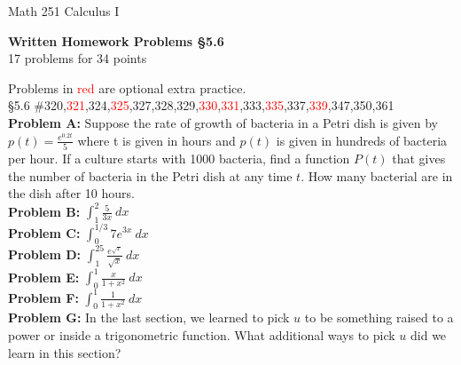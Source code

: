 \documentclass[11pt]{report}
\theoremstyle{plain}
\newcommand{\opt}[1]{\textcolor{red}{#1}}
\begin{document}
\hfill Math 251 Calculus I
\begin{center}
\Large{\textbf{Written Homework Problems \S 5.6}} \\
17 problems for 34 points\\
\end{center}

Problems in \textcolor{red}{red} are optional extra practice.\\


{\S 5.6} \#320,\opt{321},324,\opt{325},327,328,329,\opt{330},\opt{331},333,\opt{335},337,\opt{339},347,350,361\\


\textbf{Problem A:} Suppose the rate of growth of bacteria in a Petri dish is given by $p(t) = \frac{e^{0.2t}}{5}$
where t is given in hours and $p(t)$ is given in hundreds of bacteria per hour. If a culture starts with 1000 bacteria, find a function $P(t)$ that gives the number of bacteria in the Petri dish at any time $t.$ How many bacterial are in the dish after 10 hours.\\

\textbf{Problem B:} $\displaystyle \int_ 1^2 \frac{5}{3x} \:dx$\\

\textbf{Problem C:} $\displaystyle \int_0^{1/3} 7e^{3x} \: dx $\\

\textbf{Problem D:} $\displaystyle \int_1^{25} \frac{e^{\sqrt{x}}}{\sqrt{x}} \: dx $\\

\textbf{Problem E:} $\displaystyle \int_0^1 \frac{x}{1+x^2} \: dx $\\

\textbf{Problem F:} $\displaystyle\int_0^1 \frac{1}{1+x^2} \: dx $\\

\textbf{Problem G:} In the last section, we learned to pick $u$ to be something raised to a power or inside a trigonometric function. What additional ways to pick $u$ did we learn in this section?
\end{document}
